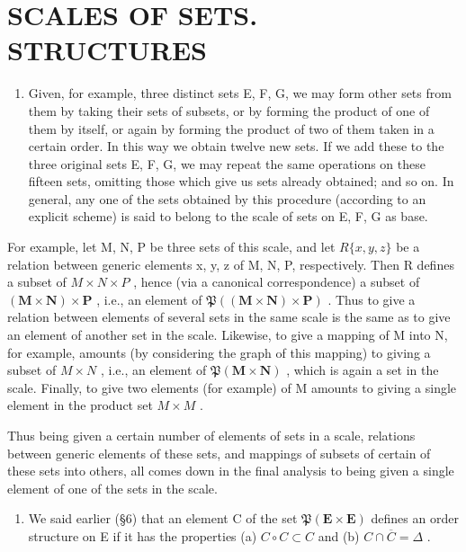 \section{SCALES OF SETS. STRUCTURES}

\begin{enumerate}
\def\labelenumi{\arabic{enumi}.}
\tightlist
\item
  Given, for example, three distinct sets E, F, G, we may form other sets from them by taking their sets of subsets, or by forming the product of one of them by itself, or again by forming the product of two of them taken in a certain order. In this way we obtain twelve new sets. If we add these to the three original sets E, F, G, we may repeat the same operations on these fifteen sets, omitting those which give us sets already obtained; and so on. In general, any one of the sets obtained by this procedure (according to an explicit scheme) is said to belong to the scale of sets on E, F, G as base.
\end{enumerate}

For example, let M, N, P be three sets of this scale, and let \(R\{x, y, z\}\) be a relation between generic elements x, y, z of M, N, P, respectively. Then R defines a subset of \(M \times N \times P\) , hence (via a canonical correspondence) a subset of \((\mathbf{M} \times \mathbf{N}) \times \mathbf{P}\) , i.e., an element of \(\mathfrak{P}((\mathbf{M} \times \mathbf{N}) \times \mathbf{P})\) . Thus to give a relation between elements of several sets in the same scale is the same as to give an element of another set in the scale. Likewise, to give a mapping of M into N, for example, amounts (by considering the graph of this mapping) to giving a subset of \(M \times N\) , i.e., an element of \(\mathfrak{P}(\mathbf{M} \times \mathbf{N})\) , which is again a set in the scale. Finally, to give two elements (for example) of M amounts to giving a single element in the product set \(M \times M\) .

Thus being given a certain number of elements of sets in a scale, relations between generic elements of these sets, and mappings of subsets of certain of these sets into others, all comes down in the final analysis to being given a single element of one of the sets in the scale.

\begin{enumerate}
\def\labelenumi{\arabic{enumi}.}
\setcounter{enumi}{1}
\tightlist
\item
  We said earlier (§6) that an element C of the set \(\mathfrak{P}(\mathbf{E} \times \mathbf{E})\) defines an order structure on E if it has the properties (a) \(C \circ C \subset C\) and (b) \(C \cap \overline{C} = \Delta\) .
\end{enumerate}

